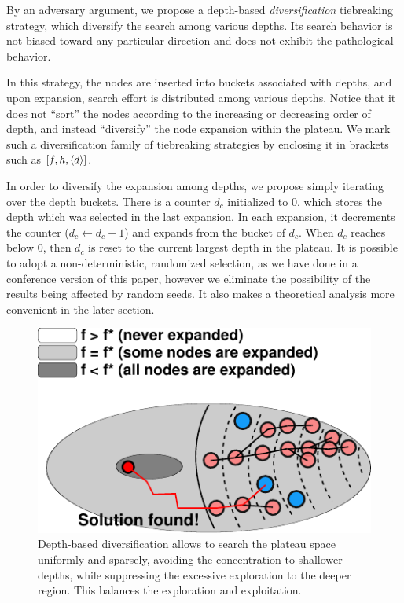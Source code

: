 By an adversary argument, we propose a depth-based \emph{diversification}
tiebreaking strategy, which diversify the search among various depths.
Its search behavior is not biased toward any particular direction and
does not exhibit the pathological behavior.

In this strategy, the nodes are inserted into buckets
associated with depths, and upon expansion, search effort is distributed
among various depths. Notice that it does not ``sort'' the nodes
according to the increasing or decreasing order of depth,
and instead ``diversify'' the node expansion
within the plateau. We mark such a diversification family of
tiebreaking strategies by enclosing it in brackets such as $[f,h,{\left<d\right>}]$.

In order to diversify the expansion among depths, we propose simply
iterating over the depth buckets. There is a counter $d_c$ initialized
to 0, which stores the depth which was selected in the last expansion.
In each expansion, it decrements the counter ($d_c\leftarrow d_c-1$) and
expands from the bucket of $d_c$. When $d_c$ reaches below 0, then $d_c$
is reset to the current largest depth in the plateau.
It is possible to adopt a
non-deterministic, randomized selection, as we have done in a conference
version of this paper, however we eliminate the possibility of the
results being affected by random seeds. It also makes a theoretical
analysis more convenient in the later section.

\begin{figure}[htbp]
 \centering
  \includegraphics{img/astar/plateau-4.pdf}
 \caption{Depth-based diversification allows \astar to search the plateau space
 uniformly and sparsely, avoiding the concentration to shallower depths, while
 suppressing the excessive exploration to the deeper region. This
 balances the exploration and exploitation.}
 \label{fig:plateau-depiction-all-optimal}
\end{figure}

